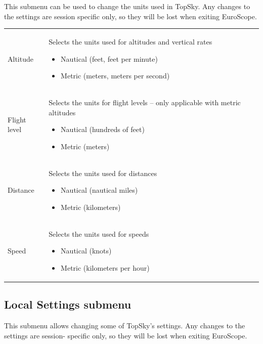 \documentclass[a4paper,oneside,11pt]{memoir}
\begin{document}
This submenu can be used to change the units used in TopSky. Any changes to the settings are session specific only, so they will be lost when exiting EuroScope.

\begin{longtable}{p{5cm} p{7.5cm}}
  Altitude & Selects the units used for altitudes and vertical rates
    \begin{itemize}
      \item Nautical (feet, feet per minute)
      \item Metric (meters, meters per second)
    \end{itemize}\\
  Flight level & Selects the units for flight levels – only applicable with metric altitudes
    \begin{itemize}
      \item Nautical (hundreds of feet)
      \item Metric (meters)
    \end{itemize}\\
  Distance & Selects the units used for distances
    \begin{itemize}
      \item  Nautical (nautical miles)
      \item Metric (kilometers)
    \end{itemize}\\
  Speed & Selects the units used for speeds
    \begin{itemize}
      \item Nautical (knots)
      \item Metric (kilometers per hour)
    \end{itemize}\\
\end{longtable}

\subsection*{Local Settings submenu}
\label{menu:localset}

This submenu allows changing some of TopSky’s settings. Any changes to the settings are session-
specific only, so they will be lost when exiting EuroScope.
\medskip
\end{document}
